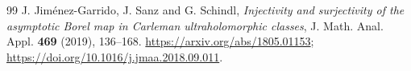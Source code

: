 \documentclass[11pt,a4paper]{article}
\theoremstyle{remark}
\begin{document}
\begingroup\small
\begin{thebibliography}{99}
 J. Jim\'enez-Garrido, J. Sanz and G. Schindl, \emph{Injectivity and surjectivity of the asymptotic Borel map in Carleman ultraholomorphic classes}, J. Math. Anal. Appl. \textbf{469} (2019), 136--168. \url{https://arxiv.org/abs/1805.01153}; \url{https://doi.org/10.1016/j.jmaa.2018.09.011}.
\end{thebibliography}
\endgroup
\end{document}
